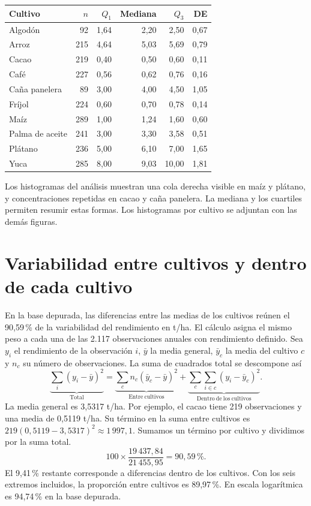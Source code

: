 \documentclass[11pt,a4paper]{article}
\begin{document}
\begin{center}
\begin{minipage}{\linewidth}
\centering\small
\begin{tabular}{lrrrrr}
\toprule
Cultivo & \(n\) & \(Q_1\) & Mediana & \(Q_3\) & DE\\
\midrule
Algodón & 92 & 1,64 & 2,20 & 2,50 & 0,67\\
Arroz & 215 & 4,64 & 5,03 & 5,69 & 0,79\\
Cacao & 219 & 0,40 & 0,50 & 0,60 & 0,11\\
Café & 227 & 0,56 & 0,62 & 0,76 & 0,16\\
Caña panelera & 89 & 3,00 & 4,00 & 4,50 & 1,05\\
Fríjol & 224 & 0,60 & 0,70 & 0,78 & 0,14\\
Maíz & 289 & 1,00 & 1,24 & 1,60 & 0,60\\
Palma de aceite & 241 & 3,00 & 3,30 & 3,58 & 0,51\\
Plátano & 236 & 5,00 & 6,10 & 7,00 & 1,65\\
Yuca & 285 & 8,00 & 9,03 & 10,00 & 1,81\\
\bottomrule
\end{tabular}
\end{minipage}
\end{center}

Los histogramas del análisis muestran una cola derecha visible en maíz y plátano,
y concentraciones repetidas en cacao y caña panelera. La mediana y los cuartiles permiten
resumir estas formas. Los histogramas por cultivo se adjuntan con las demás figuras.


\section{Variabilidad entre cultivos y dentro de cada cultivo}

En la base depurada, las diferencias entre las medias de los cultivos reúnen el
90,59\,\% de la variabilidad del rendimiento en t/ha. El cálculo asigna el mismo
peso a cada una de las 2.117 observaciones anuales con rendimiento definido.
Sea \(y_i\) el rendimiento de la observación \(i\), \(\bar y\) la media general,
\(\bar y_c\) la media del cultivo \(c\) y \(n_c\) su número de observaciones. La suma
de cuadrados total se descompone así
\[
\underbrace{\sum_i (y_i-\bar y)^2}_{\mathrm{Total}} =
\underbrace{\sum_c n_c(\bar y_c-\bar y)^2}_{\mathrm{Entre\ cultivos}} +
\underbrace{\sum_c\sum_{i\in c}(y_i-\bar y_c)^2}_{\mathrm{Dentro\ de\ los\ cultivos}}.
\]
La media general es 3,5317 t/ha. Por ejemplo, el cacao tiene 219 observaciones y una media
de 0,5119 t/ha. Su término en la suma entre cultivos es
\(219(0{,}5119-3{,}5317)^2\approx1\,997{,}1\).
Sumamos un término por cultivo y dividimos por la suma total.
\[
100\times\frac{19\,437{,}84}{21\,455{,}95}=90{,}59\,\%.
\]
El 9,41\,\% restante corresponde a diferencias
dentro de los cultivos. Con los seis extremos incluidos, la proporción entre cultivos
es 89,97\,\%. En escala logarítmica es 94,74\,\% en la base depurada.
\end{document}
